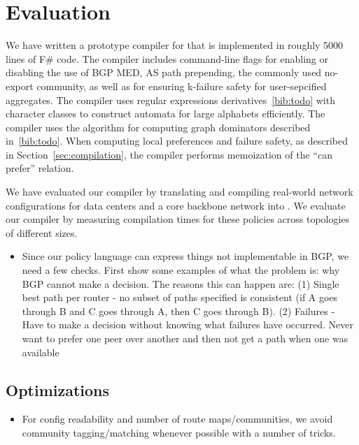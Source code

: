 \section{Evaluation}

We have written a prototype compiler for \sysname that is implemented in roughly 5000 lines of F\# code. The compiler includes command-line flags for enabling or disabling the use of BGP MED, AS path prepending, the commonly used no-export community, as well as for ensuring k-failure safety for user-sepcified aggregates. The compiler uses regular expressions derivatives~\ref{bib:todo} with character classes to construct automata for large alphabets efficiently. The compiler uses the algorithm for computing graph dominators described in~\ref{bib:todo}. When computing local preferences and failure safety, as described in Section~\ref{sec:compilation}, the compiler performs memoization of the ``can prefer'' relation. 

We have evaluated our compiler by translating and compiling real-world network configurations for data centers and a core backbone network into \sysname. We evaluate our compiler by measuring compilation times for these policies across topologies of different sizes.



\begin{itemize}
    
  \item Since our policy language can express things not implementable in BGP, we need a few checks.
      First show some examples of what the problem is: why BGP cannot make a decision.
      The reasons this can happen are:
      (1) Single best path per router - no subset of paths specified is consistent (if A goes through B and C goes through A, then C goes through B).
      (2) Failures - Have to make a decision without knowing what failures have occurred. Never want to prefer one peer over another and then not get a path when one was available
\end{itemize}


\subsection{Optimizations}

\begin{itemize}
  \item For config readability and number of route maps/communities, we avoid community tagging/matching whenever possible with a number of tricks.
\end{itemize}


